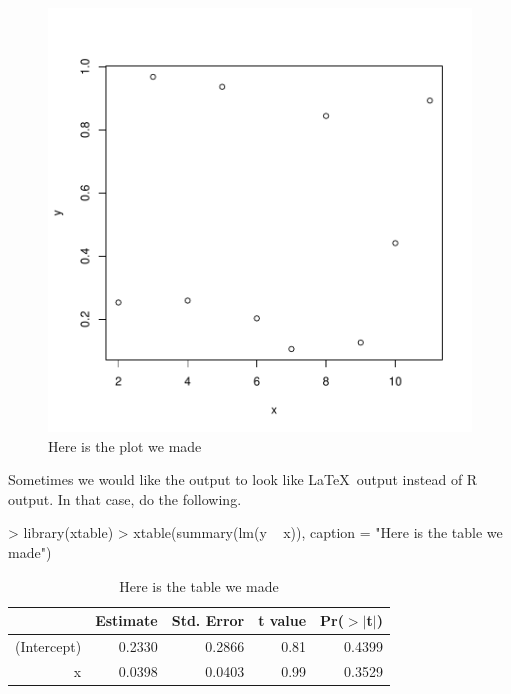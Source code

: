 \documentclass[12pt]{article}         %
\begin{document}
\begin{figure}
\includegraphics{DJI_Sweave_Template-007}
\caption{Here is the plot we made}
\end{figure}


Sometimes we would like the output to look like \LaTeX\ output instead of \textsf{R} output.  In that case, do the following.

\begin{Schunk}
\begin{Sinput}
> library(xtable)
> xtable(summary(lm(y ~ x)), caption = "Here is the table we made")
\end{Sinput}
\begin{table}[ht]
\centering
\begin{tabular}{rrrrr}
  \hline
 & Estimate & Std. Error & t value & Pr($>$$|$t$|$) \\ 
  \hline
(Intercept) & 0.2330 & 0.2866 & 0.81 & 0.4399 \\ 
  x & 0.0398 & 0.0403 & 0.99 & 0.3529 \\ 
   \hline
\end{tabular}
\caption{Here is the table we made} 
\end{table}\end{Schunk}
\end{document}
